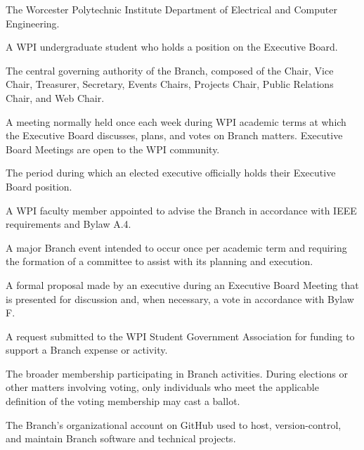 \documentclass[11pt,a4paper]{article}
\begin{document}
\begin{description}[style=nextline, leftmargin=1.5em]
    \item[ECE]
    The Worcester Polytechnic Institute Department of Electrical and Computer Engineering.

    \item[Executive]
    A WPI undergraduate student who holds a position on the Executive Board.

    \item[Executive Board]
    The central governing authority of the Branch, composed of the Chair, Vice Chair, Treasurer, Secretary, Events Chairs, Projects Chair, Public Relations Chair, and Web Chair.
    
    \item[Executive Board Meeting]
    A meeting normally held once each week during WPI academic terms at which the Executive Board discusses, plans, and votes on Branch matters. Executive Board Meetings are open to the WPI community.
    
    \item[Executive Term]
    The period during which an elected executive officially holds their Executive Board position.

    \item[Faculty Advisor]
    A WPI faculty member appointed to advise the Branch in accordance with IEEE requirements and Bylaw A.4.

    \item[Flagship Event]
    A major Branch event intended to occur once per academic term and requiring the formation of a committee to assist with its planning and execution.

    \item[Formal Motion]
    A formal proposal made by an executive during an Executive Board Meeting that is presented for discussion and, when necessary, a vote in accordance with Bylaw F.
    
    \item[Funding Request]
    A request submitted to the WPI Student Government Association for funding to support a Branch expense or activity.

    \item[General Body]
    The broader membership participating in Branch activities. During elections or other matters involving voting, only individuals who meet the applicable definition of the voting membership may cast a ballot.

    \item[GitHub Organization]
    The Branch's organizational account on GitHub used to host, version-control, and maintain Branch software and technical projects.


\end{description}
\end{document}
